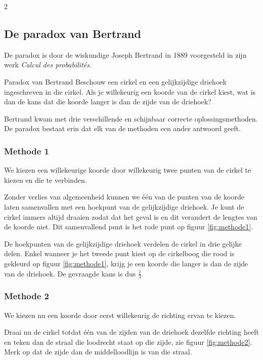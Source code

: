 \begin{multicols}{2}
	\subsection*{De paradox van Bertrand}
	De paradox is door de wiskundige Joseph Bertrand in 1889 voorgesteld in zijn werk \textit{Calcul des probabilités}.
	
	\begin{kader}{}{Paradox van Bertrand}
		Beschouw een cirkel en een gelijkzijdige driehoek ingeschreven in die cirkel. Als je willekeurig een koorde van de cirkel kiest, wat is dan de kans dat die koorde langer is dan de zijde van de driehoek?
	\end{kader}
	 
	 Bertrand kwam met drie verschillende en schijnbaar correcte oplossingsmethoden. De paradox bestaat erin dat elk van de methoden een ander antwoord geeft.
	
	\subsubsection*{Methode 1}
	We kiezen een willekeurige koorde door willekeurig twee punten van de cirkel te kiezen en die te verbinden.
	
	Zonder verlies van algemeenheid kunnen we één van de punten van de koorde laten samenvallen met een hoekpunt van de gelijkzijdige driehoek. Je kunt de cirkel immers altijd draaien zodat dat het geval is en dit verandert de lengtes van de koorde niet. Dit samenvallend punt is het rode punt op figuur \ref{fig:methode1}.	
	
	
	De hoekpunten van de gelijkzijdige driehoek verdelen de cirkel in drie gelijke delen. Enkel wanneer je het tweede punt kiest op de cirkelboog die rood is gekleurd op figuur \ref{fig:methode1}, krijg je een koorde die langer is dan de zijde van de driehoek. De gevraagde kans is dus $\frac{1}{3}$.

 \vfill
 \clearpage
	
	\subsubsection*{Methode 2}
	We kiezen nu een koorde door eerst willekeurig de richting ervan te kiezen. 
	
	Draai nu de cirkel totdat één van de zijden van de driehoek dezelfde richting heeft en teken dan de straal die loodrecht staat op die zijde, zie figuur \ref{fig:methode2}. Merk op dat de zijde dan de middelloodlijn is van die straal.
	

\end{multicols}
